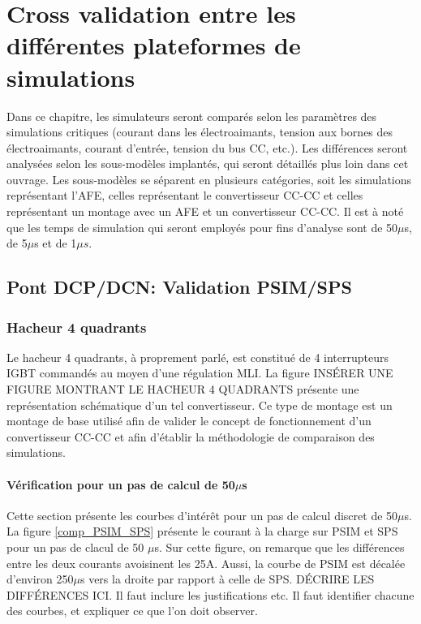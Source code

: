 \documentclass[11pt,letterpaper,final]{report}
\begin{document}
\chapter{Cross validation entre les différentes plateformes de simulations}
Dans ce chapitre, les simulateurs seront comparés selon les paramètres des simulations critiques (courant dans les électroaimants, tension aux bornes des électroaimants, courant d'entrée, tension du bus CC, etc.). Les différences seront analysées selon les sous-modèles implantés, qui seront détaillés plus loin dans cet ouvrage. Les sous-modèles se séparent en plusieurs catégories, soit les simulations représentant l'AFE, celles représentant le convertisseur CC-CC et celles représentant un montage avec un AFE et un convertisseur CC-CC. Il est à noté que les temps de simulation qui seront employés pour fins d'analyse sont de 50$\mu$s, de 5$\mu$s et de 1$\mu s$. 
\section{Pont DCP/DCN: Validation PSIM/SPS}
\subsection{Hacheur 4 quadrants}
Le hacheur 4 quadrants, à proprement parlé, est constitué de 4 interrupteurs IGBT commandés au moyen d'une régulation MLI. La figure INSÉRER UNE FIGURE MONTRANT LE HACHEUR 4 QUADRANTS présente une représentation schématique d'un tel convertisseur. Ce type de montage est un montage de base utilisé afin de valider le concept de fonctionnement d'un convertisseur CC-CC et afin d'établir la méthodologie de comparaison des simulations.
\subsubsection{Vérification pour un pas de calcul de 50$\mu$s}
Cette section présente les courbes d'intérêt pour un pas de calcul discret de 50$\mu$s. La figure \ref{comp_PSIM_SPS} présente le courant à la charge sur PSIM et SPS pour un pas de clacul de 50 $\mu$s. Sur cette figure, on remarque que les différences entre les deux courants avoisinent les 25A. Aussi, la courbe de PSIM est décalée d'environ 250$\mu$s vers la droite par rapport à celle de SPS. DÉCRIRE LES DIFFÉRENCES ICI. Il faut inclure les justifications etc. Il faut identifier chacune des courbes, et expliquer ce que l'on doit observer.
\end{document}

